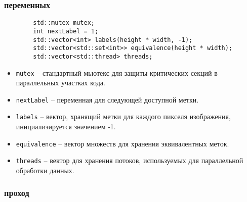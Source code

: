 \documentclass[a4paper, 14pt]{article}
\begin{document}
        \subsubsection*{ переменных}

        \begin{verbatim}
        std::mutex mutex;
        int nextLabel = 1;
        std::vector<int> labels(height * width, -1);
        std::vector<std::set<int>> equivalence(height * width);
        std::vector<std::thread> threads;
        \end{verbatim}
        
        \begin{itemize}
          \item \texttt{mutex} – стандартный мьютекс для защиты критических секций в параллельных участках кода.
          \item \texttt{nextLabel} – переменная для следующей доступной метки.
          \item \texttt{labels} – вектор, хранящий метки для каждого пикселя изображения, инициализируется значением -1.
          \item \texttt{equivalence} – вектор множеств для хранения эквивалентных меток.
          \item \texttt{threads} – вектор для хранения потоков, используемых для параллельной обработки данных.
        \end{itemize}
        
        \subsubsection*{ проход}
        
\end{document}
